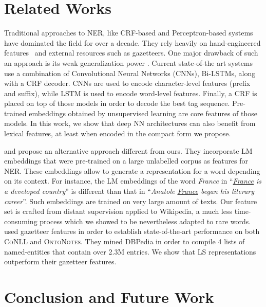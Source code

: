 \documentclass[11pt]{article}
\newcommand{\conll}{\textsc{CoNLL}}
\newcommand{\onto}{\textsc{OntoNotes}}
\newcommand{\lr}{\textsc{LS}}
\begin{document}
	\section{Related Works}
	\label{sec:related}
	
	
	Traditional approaches to NER, like CRF-based \cite{finkel2005incorporating} and Perceptron-based systems \cite{ratinov2009design} have dominated the field for over a decade. They rely heavily on hand-engineered features~\cite{luo-2015} and external resources such as gazetteers. One major drawback of such an  approach is its weak generalization power \cite{lample2016neural}.
	Current state-of-the art systems~\cite{chiu2015named,strubell2017fast} use a combination of Convolutional Neural Networks (CNNs), Bi-LSTMs, along with a CRF decoder. CNNs are used to encode character-level features (prefix and suffix), while LSTM is used to encode word-level features. Finally, a CRF is placed on top of those models in order to decode the best tag sequence. Pre-trained embeddings obtained by unsupervised learning are core features of those models.  In this work, we show that deep NN architectures can also benefit from lexical features, at least when encoded in the compact form we propose. 
	
	 and  propose an alternative approach different from ours. They incorporate LM embeddings that were pre-trained on a large unlabelled corpus as features for NER. These embeddings allow to generate a representation for a word depending on its context. For instance, the LM embeddings of the word \textit{France} in \enquote{\textit{\underline{France} is a developed country}} is different than that in \enquote{\textit{Anatole \underline{France} began his literary career}}. Such embeddings are trained on very large amount of texts. Our feature set is crafted from distant supervision applied to Wikipedia, a much less time-consuming process which we showed to be nevertheless adapted to rare words.		
	 used gazetteer features in order to establish state-of-the-art performance on both \conll{ } and \onto{}. They mined DBPedia in order to compile 4 lists of  named-entities that contain over 2.3M entries. We show that \lr{} representations outperform their gazetteer features. 

	
	\section{Conclusion and Future Work}
	\label{sec:conclusion}
	
\end{document}
